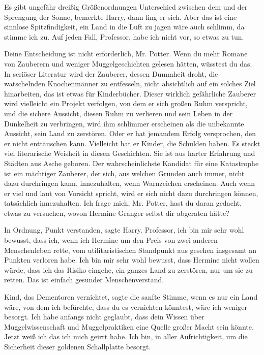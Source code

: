 \glqq Es gibt ungefähr dreißig Größenordnungen Unterschied zwischen dem und der
Sprengung der Sonne\grqq{}, bemerkte Harry, dann fing er sich. \glqq Aber das
ist eine sinnlose Spitzfindigkeit, ein Land in die Luft zu jagen wäre auch
schlimm, da stimme ich zu. Auf jeden Fall, Professor, habe ich nicht vor, so
etwas zu tun.\grqq{}

\glqq Deine Entscheidung ist nicht erforderlich, Mr. Potter. Wenn du mehr Romane
von Zauberern und weniger Muggelgeschichten gelesen hätten, wüsstest du das. In
seriöser Literatur wird der Zauberer, dessen Dummheit droht, die watschelnden
Knochenmänner zu entfesseln, nicht absichtlich auf ein solches Ziel hinarbeiten,
das ist etwas für Kinderbücher. Dieser wirklich gefährliche Zauberer wird
vielleicht ein Projekt verfolgen, von dem er sich großen Ruhm verspricht, und
die sichere Aussicht, diesen Ruhm zu verlieren und sein Leben in der Dunkelheit
zu verbringen, wird ihm schlimmer erscheinen als die unbekannte Aussicht, sein
Land zu zerstören. Oder er hat jemandem Erfolg versprochen, den er nicht
enttäuschen kann. Vielleicht hat er Kinder, die Schulden haben. Es steckt viel
literarische Weisheit in diesen Geschichten. Sie ist aus harter Erfahrung und
Städten aus Asche geboren. Der wahrscheinlichste Kandidat für eine Katastrophe
ist ein mächtiger Zauberer, der sich, aus welchen Gründen auch immer, nicht dazu
durchringen kann, innezuhalten, wenn Warnzeichen erscheinen. Auch wenn er viel
und laut von Vorsicht spricht, wird er sich nicht dazu durchringen können,
tatsächlich innezuhalten. Ich frage mich, Mr. Potter, hast du daran gedacht,
etwas zu versuchen, wovon Hermine Granger selbst dir abgeraten hätte?\grqq{}

\glqq In Ordnung, Punkt verstanden\grqq{}, sagte Harry. \glqq Professor, ich bin
mir sehr wohl bewusst, dass ich, wenn ich Hermine um den Preis von zwei anderen
Menschenleben rette, vom utilitaristischen Standpunkt aus gesehen insgesamt an
Punkten verloren habe. Ich bin mir sehr wohl bewusst, dass Hermine nicht wollen
würde, dass ich das Risiko eingehe, ein ganzes Land zu zerstören, nur um sie zu
retten. Das ist einfach gesunder Menschenverstand.\grqq{}

\glqq Kind, das Dementoren vernichtet\grqq{}, sagte die sanfte Stimme, \glqq
wenn es nur ein Land wäre, von dem ich befürchte, dass du es vernichten
könntest, wäre ich weniger besorgt. Ich habe anfangs nicht geglaubt, dass dein
Wissen über Muggelwissenschaft und Muggelpraktiken eine Quelle großer Macht sein
könnte. Jetzt weiß ich das ich mich geirrt habe. Ich bin, in aller
Aufrichtigkeit, um die Sicherheit dieser goldenen Schallplatte besorgt.\grqq{}

